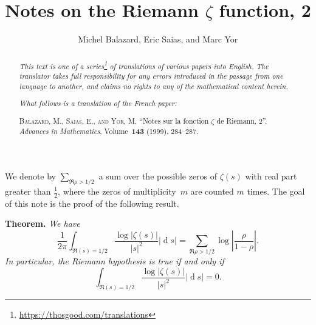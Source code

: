 \documentclass{article}
\title{Notes on the Riemann $\zeta$ function, 2}
\author{Michel Balazard, Eric Saias, and Marc Yor}
\date{}
\newcommand{\doctype}{French paper}
\newcommand{\origcit}{%
  \textsc{Balazard, M., Saias, E., and Yor, M.}
  ``Notes sur la fonction $\zeta$ de Riemann, 2''.
  \emph{Advances in Mathematics}, Volume~\textbf{143} (1999), 284--287.%
}
\newenvironment{itenv}[1]
  {\phantomsection\par\medskip\noindent\textbf{#1.}\itshape}
  {\medskip}
\newcommand{\dd}{\operatorname{d}\!}
\newcommand{\oldpage}[1]{\marginpar{\footnotesize$\Big\vert$ \textit{p.~#1}}}
\begin{document}
\maketitle
\thispagestyle{fancy}

\renewcommand{\abstractname}{Translator's note.}

\begin{abstract}
  \renewcommand*{\thefootnote}{\fnsymbol{footnote}}
  \emph{This text is one of a series\footnote{\url{https://thosgood.com/translations}} of translations of various papers into English.}
  \emph{The translator takes full responsibility for any errors introduced in the passage from one language to another, and claims no rights to any of the mathematical content herein.}

  \medskip
  
  \emph{What follows is a translation of the \doctype:}

  \medskip\noindent
  \origcit
\end{abstract}

\setcounter{footnote}{0}

\bigskip



\bigskip

\oldpage{284}
We denote by $\sum_{\Re\rho>1/2}$ a sum over the possible zeros of $\zeta(s)$ with real part greater than $\frac12$, where the zeros of multiplicity~$m$ are counted $m$ times.
The goal of this note is the proof of the following result.

\begin{itenv}{Theorem}
  We have
  \[
  \label{1}
    \frac{1}{2\pi}\int_{\Re(s)=1/2} \frac{\log|\zeta(s)|}{|s|^2}|\dd s|
    = \sum_{\Re\rho>1/2} \log\left|\frac{\rho}{1-\rho}\right|.
  \tag{1}
  \]
  In particular, the Riemann hypothesis is true if and only if
  \[
    \int_{\Re(s)=1/2} \frac{\log|\zeta(s)|}{|s|^2}|\dd s| = 0.
  \]
\end{itenv}
\end{document}
